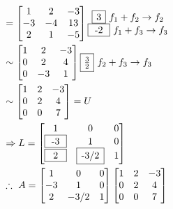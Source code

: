 	\begin{align*}
		&=\begin{bmatrix}
			1&2&-3\\
			-3&-4&13\\
			2&1&-5
		\end{bmatrix} \begin{matrix}
			\framebox[0.5cm]{3} \ f_1+f_2\rightarrow f_2\\
			\framebox[0.8cm]{-2} \ f_1+f_3\rightarrow f_3
		\end{matrix}\\
		&\sim\begin{bmatrix}
			1&2&-3\\
			0&2&4\\
			0&-3&1
		\end{bmatrix} \begin{matrix}
			\framebox[0.5cm]{$\frac{3}{2}$} \ f_2+f_3\rightarrow f_3
		\end{matrix}\\
		&\sim\begin{bmatrix}
			1&2&-3\\
			0&2&4\\
			0&0&7
		\end{bmatrix}=U\\
		&\Rightarrow L=\begin{bmatrix}
			1&0&0\\
			\framebox[0.8cm]{-3}&1&0\\
			\framebox[0.8cm]{2}&\framebox[1cm]{-3/2}&1
		\end{bmatrix}\\
		&\therefore \ A=\begin{bmatrix}
			1&0&0\\
			-3&1&0\\
			2&-3/2&1
		\end{bmatrix}\begin{bmatrix}
			1&2&-3\\
			0&2&4\\
			0&0&7
		\end{bmatrix}
	\end{align*}
\hspace*{\fill}\colorbox{gray!55}{ } \\
